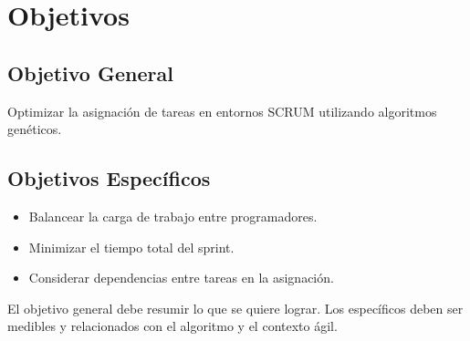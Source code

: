\section{Objetivos}

\subsection*{Objetivo General}
Optimizar la asignación de tareas en entornos SCRUM utilizando algoritmos genéticos.

\subsection*{Objetivos Específicos}
\begin{itemize}
    \item Balancear la carga de trabajo entre programadores.
    \item Minimizar el tiempo total del sprint.
    \item Considerar dependencias entre tareas en la asignación.
\end{itemize}
\vspace{0.5cm}

\begin{tcolorbox}[colback=gray!10, colframe=black!30, title={Sugerencia para esta sección}]
    El objetivo general debe resumir lo que se quiere lograr. Los específicos deben ser medibles y relacionados con el algoritmo y el contexto ágil.
\end{tcolorbox}
